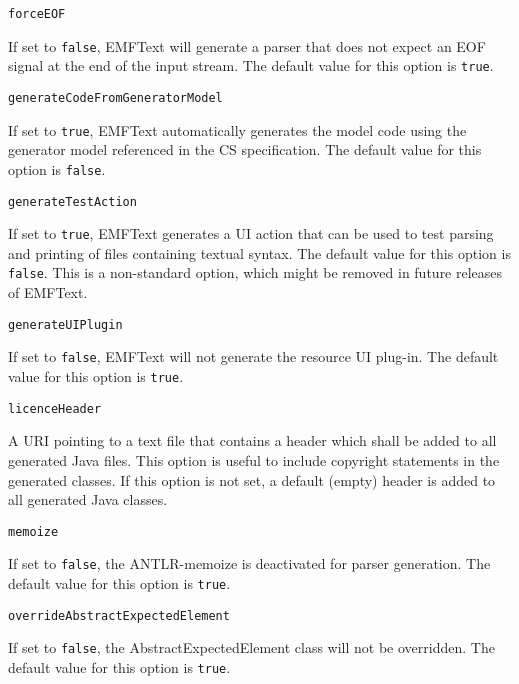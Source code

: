 \noindent\texttt{forceEOF}
\begin{myindentpar}{1cm}
If set to \texttt{false}, EMFText will generate a parser that does not expect an EOF signal at the end of the input stream. The default value for this option is \texttt{true}.
\end{myindentpar}

\noindent\texttt{generateCodeFromGeneratorModel}
\begin{myindentpar}{1cm}
If set to \texttt{true}, EMFText automatically generates the model code using the generator model referenced in the CS specification. The default value for this option is \texttt{false}.
\end{myindentpar}

\noindent\texttt{generateTestAction}
\begin{myindentpar}{1cm}
If set to \texttt{true}, EMFText generates a UI action that can be used to test parsing and printing of files containing textual syntax. The default value for this option is \texttt{false}. This is a non-standard option, which might be removed in future releases of EMFText.
\end{myindentpar}

\noindent\texttt{generateUIPlugin}
\begin{myindentpar}{1cm}
If set to \texttt{false}, EMFText will not generate the resource UI plug-in. The default value for this option is \texttt{true}.
\end{myindentpar}

\noindent\texttt{licenceHeader}
\begin{myindentpar}{1cm}
A URI pointing to a text file that contains a header which shall be added to all generated Java files. This option is useful to include copyright statements in the generated classes. If this option is not set, a default (empty) header is added to all generated Java classes.
\end{myindentpar}

\noindent\texttt{memoize}
\begin{myindentpar}{1cm}
If set to \texttt{false}, the ANTLR-memoize is deactivated for parser generation. The default value for this option is \texttt{true}.
\end{myindentpar}

\noindent\texttt{overrideAbstractExpectedElement}
\begin{myindentpar}{1cm}
If set to \texttt{false}, the AbstractExpectedElement class will not be overridden. The default value for this option is \texttt{true}.
\end{myindentpar}

